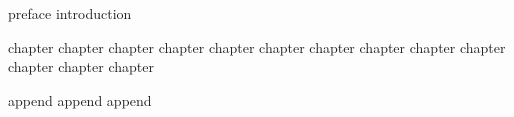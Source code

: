 \documentclass{claynote}
\begin{document}
\begin{void}
{

    \begin{pre}
        {preface}
        {introduction}
    \end{pre}

    \begin{body}
        {chapter}
        {chapter}
        {chapter}
        {chapter}
        {chapter}
        {chapter}
        {chapter}
        {chapter}
        {chapter}
        {chapter}
        {chapter}
        {chapter}
        {chapter}
    \end{body}

    \begin{append}
        {append}
        {append}
        {append}
    \end{append}
}
\end{void}
\end{document}

